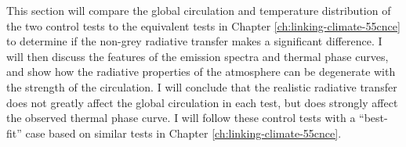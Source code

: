 
This section will compare the global circulation and temperature distribution of the two control tests to the equivalent tests in Chapter \ref{ch:linking-climate-55cnce} to determine if the non-grey radiative transfer makes a significant difference. I will then discuss the features of the emission spectra and thermal phase curves, and show how the radiative properties of the atmosphere can be degenerate with the strength of the circulation. I will conclude that the realistic radiative transfer does not greatly affect the global circulation in each test, but does strongly affect the observed thermal phase curve. I will follow these control tests with a ``best-fit'' case based on similar tests in Chapter \ref{ch:linking-climate-55cnce}.



%




